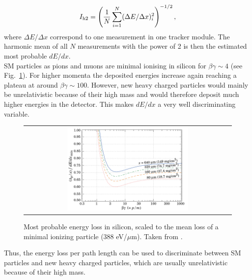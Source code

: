 \begin{equation}
I_{\text{h2}}=\left( \frac{1}{N}\sum_{i=1}^{N}(\Delta E/\Delta x)_i^2 \right)^{-1/2},
\label{eq:Harmonic2Estimator}
\end{equation}
where $\Delta E /\Delta x$ correspond to one measurement in one tracker module. 
The harmonic mean of all $N$ measurements with the power of 2 is then the estimated most probable $dE/dx$.\\

SM particles as pions and muons are minimal ionising in silicon for $\beta\gamma \sim 4$ (see Fig.~\ref{fig:dEdx_Landau_Silicon}). 
For higher momenta the deposited energies increase again reaching a plateau at around $\beta\gamma\sim100$. 
However, new heavy charged particles would mainly be unrelativistic because of their high mass and would therefore deposit much higher energies in the detector.
This makes $dE/dx$  a very well discriminating variable.
\begin{figure}[!bt]
  \centering 
  \begin{tabular}{c}
  \includegraphics[width=0.6\textwidth]{figures/analysis/dEdx_Landau_Silicon.png}
  \end{tabular}
  \caption{Most probable energy loss in silicon, scaled to the mean loss of a minimal ionizing particle (388 eV/$\mu$m). Taken from \cite{bib:PDG_2014}.} 
  \label{fig:dEdx_Landau_Silicon}
\end{figure}
Thus, the energy loss per path length can be used to discriminate between SM particles and new heavy charged particles, which are usually unrelativistic because of their high mass.

